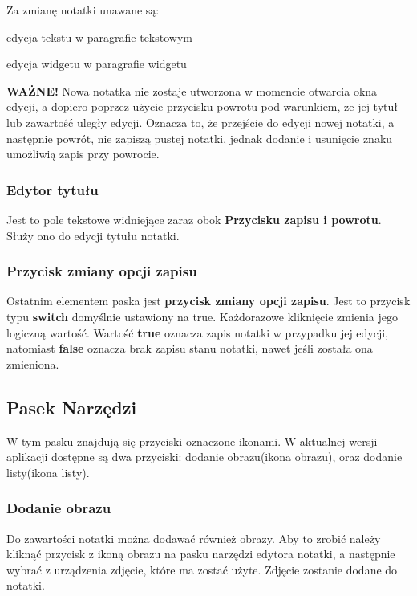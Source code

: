 Za zmianę notatki unawane są:

\begin{compactitem}
    \item edycja tekstu w paragrafie tekstowym
    \item edycja widgetu w paragrafie widgetu
\end{compactitem}
\vspace{5mm}

\textbf{WAŻNE!} Nowa notatka nie zostaje utworzona w momencie otwarcia okna edycji, a dopiero poprzez użycie przycisku powrotu pod warunkiem, ze jej tytuł lub zawartość uległy edycji. Oznacza to, że przejście do edycji nowej notatki, a następnie powrót, nie zapiszą pustej notatki, jednak dodanie i usunięcie znaku umożliwią zapis przy powrocie.

\subsubsection{Edytor tytułu}

Jest to pole tekstowe widniejące zaraz obok \textbf{Przycisku zapisu i powrotu}. Służy ono do edycji tytułu notatki.

\subsubsection{Przycisk zmiany opcji zapisu}

Ostatnim elementem paska jest \textbf{przycisk zmiany opcji zapisu}. Jest to przycisk typu \textbf{switch} domyślnie ustawiony na true. Każdorazowe kliknięcie zmienia jego logiczną wartość.
Wartość \textbf{true} oznacza zapis notatki w przypadku jej edycji, natomiast \textbf{false} oznacza brak zapisu stanu notatki, nawet jeśli została ona zmieniona.

\subsection{Pasek Narzędzi}

W tym pasku znajdują się przyciski oznaczone ikonami.
W aktualnej wersji aplikacji dostępne są dwa przyciski: dodanie obrazu(ikona obrazu), oraz dodanie listy(ikona listy).

\subsubsection{Dodanie obrazu}

Do zawartości notatki można dodawać również obrazy. Aby to zrobić należy kliknąć przycisk z ikoną obrazu na pasku narzędzi edytora notatki, a następnie wybrać z urządzenia zdjęcie, które ma zostać użyte. Zdjęcie zostanie dodane do notatki.

